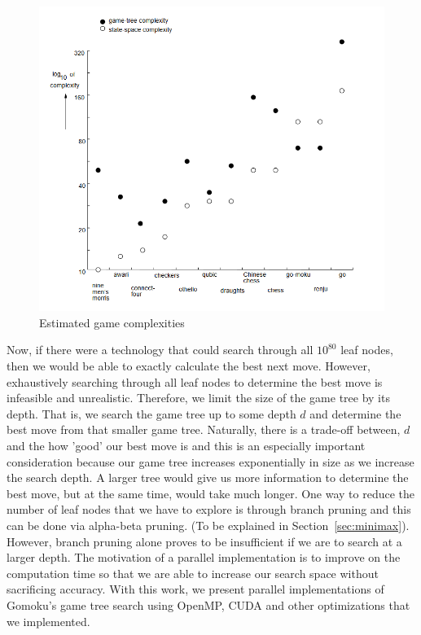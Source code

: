 \begin{figure}[ht]
    \centering
    \includegraphics[scale=0.58]{images/complexity.PNG}
    \caption{Estimated game complexities \cite{allis_1994}}
    \label{fig:complexity}
\end{figure}

\noindent
Now, if there were a technology that could search through all $10^{80}$ leaf nodes, then we would be able to exactly calculate the best next move. However, exhaustively searching through all leaf nodes to determine the best move is infeasible and unrealistic. Therefore, we limit the size of the game tree by its depth. That is, we search the game tree up to some depth $d$ and determine the best move from that smaller game tree. Naturally, there is a trade-off between, $d$ and the how 'good' our best move is and this is an especially important consideration because our game tree increases exponentially in size as we increase the search depth. A larger tree would give us more information to determine the best move, but at the same time, would take much longer. One way to reduce the number of leaf nodes that we have to explore is through branch pruning and this can be done via alpha-beta pruning. (To be explained in Section~\ref{sec:minimax}). However, branch pruning alone proves to be insufficient if we are to search at a larger depth. The motivation of a parallel implementation is to improve on the computation time so that we are able to increase our search space without sacrificing accuracy. With this work, we present parallel implementations of Gomoku's game tree search using OpenMP, CUDA and other optimizations that we implemented.\\
